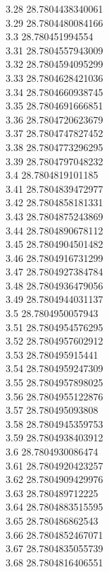 {3.28	28.7804438340061\\
3.29	28.7804480084166\\
3.3	28.780451994554\\
3.31	28.7804557943009\\
3.32	28.7804594095299\\
3.33	28.7804628421036\\
3.34	28.7804660938745\\
3.35	28.7804691666851\\
3.36	28.7804720623679\\
3.37	28.7804747827452\\
3.38	28.7804773296295\\
3.39	28.7804797048232\\
3.4	28.7804819101185\\
3.41	28.7804839472977\\
3.42	28.7804858181331\\
3.43	28.7804875243869\\
3.44	28.7804890678112\\
3.45	28.7804904501482\\
3.46	28.7804916731299\\
3.47	28.7804927384784\\
3.48	28.7804936479056\\
3.49	28.7804944031137\\
3.5	28.7804950057943\\
3.51	28.7804954576295\\
3.52	28.7804957602912\\
3.53	28.780495915441\\
3.54	28.7804959247309\\
3.55	28.7804957898025\\
3.56	28.7804955122876\\
3.57	28.780495093808\\
3.58	28.7804945359753\\
3.59	28.7804938403912\\
3.6	28.7804930086474\\
3.61	28.7804920423257\\
3.62	28.7804909429976\\
3.63	28.780489712225\\
3.64	28.7804883515595\\
3.65	28.780486862543\\
3.66	28.7804852467071\\
3.67	28.7804835055739\\
3.68	28.7804816406551\\
}
